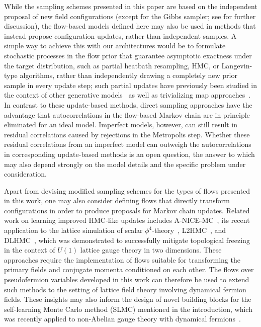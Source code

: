 \documentclass[aps,prd,twocolumn,nofootinbib,superscriptaddress,preprintnumbers]{revtex4-1}
\begin{document}
While the sampling schemes presented in this paper are based on the independent proposal of new field configurations (except for the Gibbs sampler; see  for further discussion), the flow-based models defined here may also be used in methods that instead propose configuration updates, rather than independent samples. A simple way to achieve this with our architectures would be to formulate stochastic processes in the flow prior that guarantee asymptotic exactness under the target distribution, such as partial heatbath resampling, HMC, or Langevin-type algorithms, rather than independently drawing a completely new prior sample in every update step; such partial updates have previously been studied in the context of other generative models~\cite{Li2018,ZhangEWang2018Monge,Hu:2019nea} as well as trivializing map approaches~\cite{Luscher:2009eq,Engel:2011re}. In contrast to these update-based methods, direct sampling approaches have the advantage that autocorrelations in the flow-based Markov chain are in principle eliminated for an ideal model. Imperfect models, however, can still result in residual correlations caused by rejections in the Metropolis step. Whether these residual correlations from an imperfect model can outweigh the autocorrelations in corresponding update-based methods is an open question, the answer to which may also depend strongly on the model details and the specific problem under consideration.

Apart from devising modified sampling schemes for the types of flows presented in this work, one may also consider defining flows that directly transform configurations in order to produce proposals for Markov chain updates. Related work on learning improved HMC-like updates includes A-NICE-MC~\cite{song2018anicemc}, its recent application to the lattice simulation of scalar $\phi^4$-theory~\cite{medvidovic2021generative}, L2HMC~\cite{levy2018generalizing}, and DLHMC~\cite{Foreman:2021ixr}, which was demonstrated to successfully mitigate topological freezing in the context of $U(1)$ lattice gauge theory in two dimensions. These approaches require the implementation of flows suitable for transforming the primary fields and conjugate momenta conditioned on each other. The flows over pseudofermion variables developed in this work can therefore be used to extend such methods to the setting of lattice field theory involving dynamical fermion fields. These insights may also inform the design of novel building blocks for the self-learning Monte Carlo method (SLMC) mentioned in the introduction, which was recently applied to non-Abelian gauge theory with dynamical fermions~\cite{Nagai:2020jar}.
\end{document}
